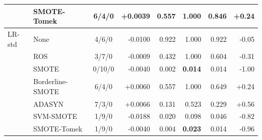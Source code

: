 \documentclass[10pt,a4paper]{article}
\begin{document}
\begin{center}
\begin{longtable}{@{}llcrrrrr@{}}
 & SMOTE-Tomek & 6/4/0 & +0.0039 & 0.557 & 1.000 & 0.846 & +0.24 \\
\midrule
LR-std & None & 4/6/0 & -0.0100 & 0.922 & 1.000 & 0.922 & -0.05 \\
 & ROS & 3/7/0 & -0.0009 & 0.432 & 1.000 & 0.604 & -0.31 \\
 & SMOTE & 0/10/0 & -0.0040 & 0.002 & \textbf{0.014} & 0.014 & -1.00 \\
 & Borderline-SMOTE & 6/4/0 & +0.0060 & 0.557 & 1.000 & 0.649 & +0.24 \\
 & ADASYN & 7/3/0 & +0.0066 & 0.131 & 0.523 & 0.229 & +0.56 \\
 & SVM-SMOTE & 1/9/0 & -0.0188 & 0.020 & 0.098 & 0.046 & -0.82 \\
 & SMOTE-Tomek & 1/9/0 & -0.0040 & 0.004 & \textbf{0.023} & 0.014 & -0.96 \\
\midrule
\bottomrule\end{longtable}\end{center}
\end{document}
